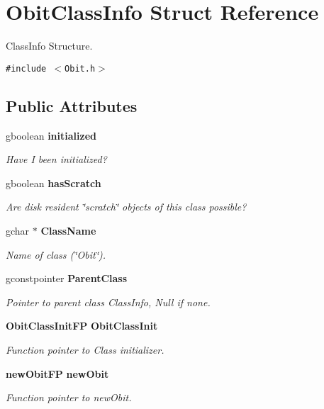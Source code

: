 \section{Obit\-Class\-Info Struct Reference}
\label{structObitClassInfo}
Class\-Info Structure.  


{\tt \#include $<$Obit.h$>$}

\subsection*{Public Attributes}
\begin{CompactItemize}
\item 
gboolean {\bf initialized}
\begin{CompactList}\small\item\em Have I been initialized? \item\end{CompactList}\item 
gboolean {\bf has\-Scratch}
\begin{CompactList}\small\item\em Are disk resident \char`\"{}scratch\char`\"{} objects of this class possible? \item\end{CompactList}\item 
gchar $\ast$ {\bf Class\-Name}
\begin{CompactList}\small\item\em Name of class (\char`\"{}Obit\char`\"{}). \item\end{CompactList}\item 
gconstpointer {\bf Parent\-Class}
\begin{CompactList}\small\item\em Pointer to parent class Class\-Info, Null if none. \item\end{CompactList}\item 
{\bf Obit\-Class\-Init\-FP} {\bf Obit\-Class\-Init}
\begin{CompactList}\small\item\em Function pointer to Class initializer. \item\end{CompactList}\item 
{\bf new\-Obit\-FP} {\bf new\-Obit}
\begin{CompactList}\small\item\em Function pointer to new\-Obit. \item\end{CompactList}\item 

\end{CompactItemize}
